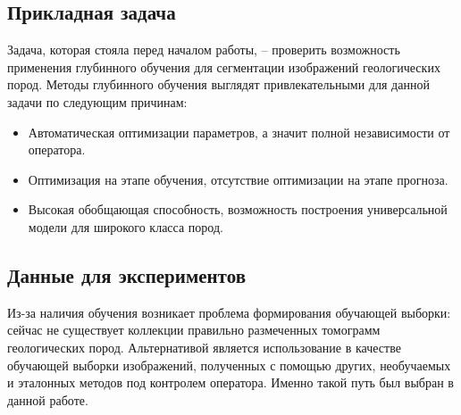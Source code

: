 \documentclass[12pt, a4paper]{extarticle}
\begin{document}
\subsection{Прикладная задача}

Задача, которая стояла перед началом работы, -- проверить возможность применения глубинного обучения для сегментации изображений геологических пород. 
Методы глубинного обучения выглядят привлекательными для данной задачи по следующим причинам:
\begin{itemize}
	\item Автоматическая оптимизации параметров, а значит полной 	независимости от оператора.
	
	\item Оптимизация на этапе обучения, отсутствие оптимизации на этапе прогноза.
	
	\item Высокая обобщающая способность, возможность построения универсальной модели для широкого класса пород.
	
\end{itemize}
 
\subsection{Данные для экспериментов}

Из-за наличия обучения возникает проблема формирования обучающей выборки: сейчас не существует коллекции правильно размеченных томограмм геологических пород. Альтернативой является использование в качестве обучающей выборки изображений, полученных с помощью других, необучаемых и эталонных методов под контролем оператора. Именно такой путь был выбран в данной работе.
\end{document}
